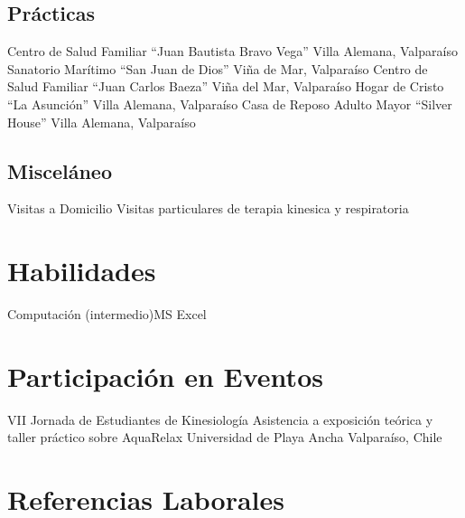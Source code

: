 \documentclass[11pt,a4paper,sans]{moderncv}
\begin{document}
\newpage
\subsection{Prácticas}

\cventry{}
        {Centro de Salud Familiar ``Juan Bautista Bravo Vega''}
        {}
        {}
        {Villa Alemana, Valparaíso}
        {}
\cventry{}
        {Sanatorio Marítimo ``San Juan de Dios''}
        {}
        {}
        {Viña de Mar, Valparaíso}
        {}
\cventry{}
        {Centro de Salud Familiar ``Juan Carlos Baeza''}
        {}
        {}
        {Viña del Mar, Valparaíso}
        {}
\cventry{}
        {Hogar de Cristo ``La Asunción''}
        {}
        {}
        {Villa Alemana, Valparaíso}
        {}
\cventry{}
        {Casa de Reposo Adulto Mayor ``Silver House''}
        {}
        {}
        {Villa Alemana, Valparaíso}
        {}
        
        
\subsection{Misceláneo}


\cventry{}
        {Visitas a Domicilio}
        {Visitas particulares de terapia kinesica y respiratoria}
        {}
        {}
        {}
        
\section{Habilidades}
           {Computación (intermedio)}{MS Excel}

\section{Participación en Eventos}

        {VII Jornada de Estudiantes de Kinesiología}
        {Asistencia a exposición teórica y taller práctico sobre AquaRelax}
        {Universidad de Playa Ancha}
        {Valparaíso, Chile}
        {}
        
\section{Referencias Laborales}

\end{document}
